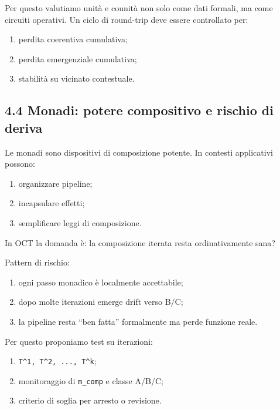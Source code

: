 Per questo valutiamo unità e counità non solo come dati formali, ma come circuiti operativi. Un ciclo di round-trip deve essere controllato per:

\begin{enumerate}
\def\labelenumi{\arabic{enumi}.}
\tightlist
\item
  perdita coerentiva cumulativa;
\item
  perdita emergenziale cumulativa;
\item
  stabilità su vicinato contestuale.
\end{enumerate}

\subsection{4.4 Monadi: potere compositivo e rischio di deriva}

Le monadi sono dispositivi di composizione potente. In contesti applicativi possono:

\begin{enumerate}
\def\labelenumi{\arabic{enumi}.}
\tightlist
\item
  organizzare pipeline;
\item
  incapsulare effetti;
\item
  semplificare leggi di composizione.
\end{enumerate}

In OCT la domanda è: la composizione iterata resta ordinativamente sana?

Pattern di rischio:

\begin{enumerate}
\def\labelenumi{\arabic{enumi}.}
\tightlist
\item
  ogni passo monadico è localmente accettabile;
\item
  dopo molte iterazioni emerge drift verso B/C;
\item
  la pipeline resta ``ben fatta'' formalmente ma perde funzione reale.
\end{enumerate}

Per questo proponiamo test su iterazioni:

\begin{enumerate}
\def\labelenumi{\arabic{enumi}.}
\tightlist
\item
  \texttt{T\^{}1,\ T\^{}2,\ ...,\ T\^{}k};
\item
  monitoraggio di \texttt{m\_comp} e classe A/B/C;
\item
  criterio di soglia per arresto o revisione.
\end{enumerate}

